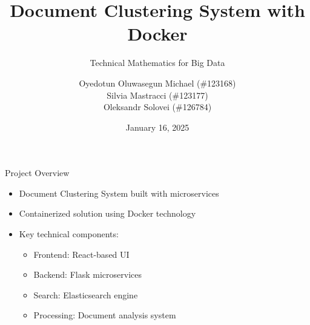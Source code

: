 \documentclass[notes]{beamer}
\title{Document Clustering System with Docker}
\subtitle{Technical Mathematics for Big Data}
\author{Oyedotun Oluwasegun Michael (\#123168) \\ Silvia Mastracci (\#123177) \\ Oleksandr Solovei (\#126784)}
\date{January 16, 2025}
\begin{document}
\begin{frame}
    \titlepage
\end{frame}

\begin{frame}{Project Overview}
    \begin{itemize}
        \item Document Clustering System built with microservices
        \item Containerized solution using Docker technology
        \item Key technical components:
        \begin{itemize}
            \item Frontend: React-based UI
            \item Backend: Flask microservices
            \item Search: Elasticsearch engine
            \item Processing: Document analysis system
        \end{itemize}
    \end{itemize}
\end{frame}
\end{document}
